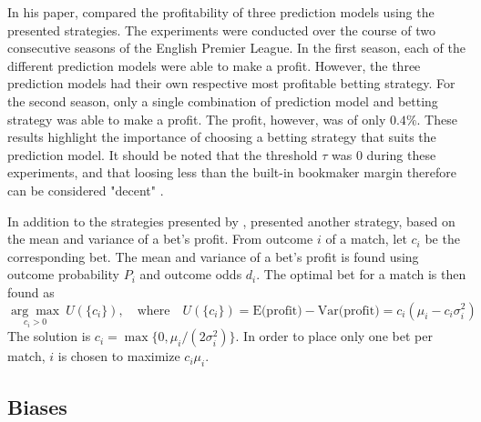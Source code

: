 In his paper, \citet{bib:langseth-2013} compared the profitability of three prediction models using the presented strategies. The experiments were conducted over the course of two consecutive seasons of the English Premier League. In the first season, each of the different prediction models were able to make a profit. However, the three prediction models had their own respective most profitable betting strategy. For the second season, only a single combination of prediction model and betting strategy was able to make a profit. The profit, however, was of only $0.4\%$. These results highlight the importance of choosing a betting strategy that suits the prediction model. It should be noted that the threshold $\tau$ was $0$ during these experiments, and that loosing less than the built-in bookmaker margin therefore can be considered "decent" \citep{bib:langseth-2013}.

In addition to the strategies presented by \citet{bib:langseth-2013}, \citet{bib:rue-salvesen-2000} presented another strategy, based on the mean and variance of a bet's profit. From outcome $i$ of a match, let $c_{i}$ be the corresponding bet. The mean and variance of a bet's profit is found using outcome probability $P_{i}$ and outcome odds $d_{i}$. The optimal bet for a match is then found as
\begin{equation*}
    \underset{c_{i} > 0}{\arg\max}\ U(\{c_{i}\}), \quad \text{where} \quad U(\{c_{i}\}) = \text{E(profit)} - \text{Var(profit)} = c_{i} (\mu_{i} - c_{i} \sigma_{i}^{2})
\end{equation*}
The solution is $c_{i} = \max \{ 0, \mu_{i}/(2 \sigma_{i}^{2}) \}$. In order to place only one bet per match, $i$ is chosen to maximize $c_{i} \mu_{i}$.



\subsection{Biases}
\label{subsec:background-betting-biases}

